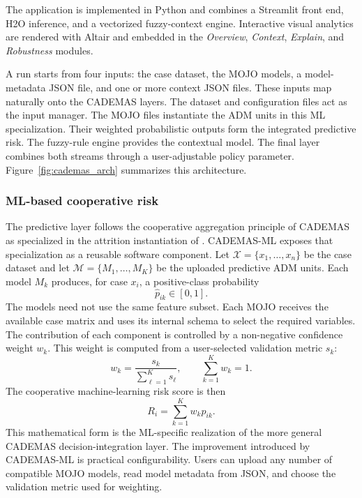 \documentclass{interact}
\begin{document}
The application is implemented in Python and combines a Streamlit \citep{streamlit} front end, H2O\citep{H2O.ai2026} inference, and a vectorized fuzzy-context engine. Interactive visual analytics are rendered with Altair \citep{VanderPlas2018} and embedded in the \textit{Overview}, \textit{Context}, \textit{Explain}, and \textit{Robustness} modules. 

A run starts from four inputs: the case dataset, the MOJO models, a model-metadata JSON file, and one or more context JSON files. These inputs map naturally onto the CADEMAS layers. The dataset and configuration files act as the input manager. The MOJO files instantiate the ADM units in this ML specialization. Their weighted probabilistic outputs form the integrated predictive risk. The fuzzy-rule engine provides the contextual model. The final layer combines both streams through a user-adjustable policy parameter. Figure~\ref{fig:cademas_arch} summarizes this architecture.

\subsubsection{ML-based cooperative risk}

The predictive layer follows the cooperative aggregation principle of CADEMAS as specialized in the attrition instantiation of \citet{Godz2026}. CADEMAS-ML exposes that specialization as a reusable software component. Let $\mathcal{X}=\{x_1,\ldots,x_n\}$ be the case dataset and let $\mathcal{M}=\{M_1,\ldots,M_K\}$ be the uploaded predictive ADM units. Each model $M_k$ produces, for case $x_i$, a positive-class probability
\[
\hat{p}_{ik} \in [0,1].
\]
The models need not use the same feature subset. Each MOJO receives the available case matrix and uses its internal schema to select the required variables. The contribution of each component is controlled by a non-negative confidence weight $w_k$. This weight is computed from a user-selected validation metric $s_k$:
\begin{equation}
w_k = \frac{s_k}{\sum_{\ell=1}^{K} s_\ell}, \qquad \sum_{k=1}^{K}w_k=1.
\label{eq:model_weights}
\end{equation}
The cooperative machine-learning risk score is then
\begin{equation}
R_i=\sum_{k=1}^{K}w_k\hat{p}_{ik}.
\label{eq:ml_risk}
\end{equation}
This mathematical form is the ML-specific realization of the more general CADEMAS decision-integration layer. The improvement introduced by CADEMAS-ML is practical configurability. Users can upload any number of compatible MOJO models, read model metadata from JSON, and choose the validation metric used for weighting.
\end{document}
